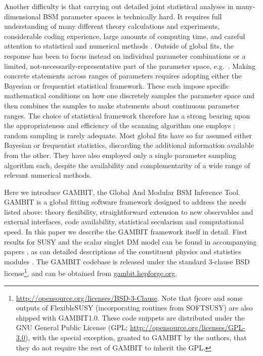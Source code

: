 \documentclass[pdftex,twocolumn,epjc3_preprint,runningheads]{svjour3}
\renewcommand{\_}{\discretionary{\underscore}{}{\underscore}}
\newcommand{\gambit}{\textsf{GAMBIT}\xspace}
\newcommand{\GB}{\gambit}
\newcommand\flexiblesusy{\FlexibleSUSY}
\newcommand\FlexibleSUSY{\textsf{FlexibleSUSY}\xspace}
\newcommand\SOFTSUSY{\textsf{SOFTSUSY}\xspace}
\begin{document}
Another difficulty is that carrying out detailed joint statistical analyses in many-dimensional BSM parameter spaces is technically hard.  It requires full understanding of many different theory calculations and experiments, considerable coding experience, large amounts of computing time, and careful attention to statistical and numerical methods \cite{Akrami09,SBSpike,Akrami11coverage,Strege12,Fittinocoverage}.  Outside of global fits, the response has been to focus instead on individual parameter combinations or a limited, not-necessarily-representative part of the parameter space, e.g.\ \cite{ATLAS15,CMS_SMS,Berger09}. Making concrete statements across ranges of parameters requires adopting either the Bayesian or frequentist statistical framework.  These each impose specific mathematical conditions on how one discretely samples the parameter space and then combines the samples to make statements about continuous parameter ranges.  The choice of statistical framework therefore has a strong bearing upon the appropriateness and efficiency of the scanning algorithm one employs \cite{Akrami09,SBSpike}; random sampling is rarely adequate.  Most global fits have so far assumed either Bayesian or frequentist statistics, discarding the additional information available from the other.  They have also employed only a single parameter sampling algorithm each, despite the availability and complementarity of a wide range of relevant numerical methods.

Here we introduce \GB, the Global And Modular BSM Inference Tool.  \GB is a global fitting software framework designed to address the needs listed above: theory flexibility, straightforward extension to new observables and external interfaces, code availability, statistical secularism and computational speed.  In this paper we describe the \GB framework itself in detail.  First results for SUSY and the scalar singlet DM model can be found in accompanying papers \cite{CMSSM,MSSM,SSDM}, as can detailed descriptions of the constituent physics and statistics modules \cite{ColliderBit,FlavBit,DarkBit,SDPBit,ScannerBit}.  The \GB codebase is released under the standard 3-clause BSD license\footnote{\href{http://opensource.org/licenses/BSD-3-Clause}{http://opensource.org/licenses/BSD-3-Clause}.  Note that \textsf{fjcore} \cite{Cacciari:2011ma} and some outputs of \flexiblesusy \cite{Athron:2014yba} (incorporating routines from \SOFTSUSY \cite{Allanach:2001kg}) are also shipped with \GB \textsf{1.0}.  These code snippets are distributed under the GNU General Public License (GPL; \href{http://opensource.org/licenses/GPL-3.0}{http://opensource.org/licenses/GPL-3.0}), with the special exception, granted to \GB by the authors, that they do not require the rest of \GB to inherit the GPL.}, and can be obtained from \href{http://gambit.hepforge.org}{gambit.hepforge.org}.
\end{document}

